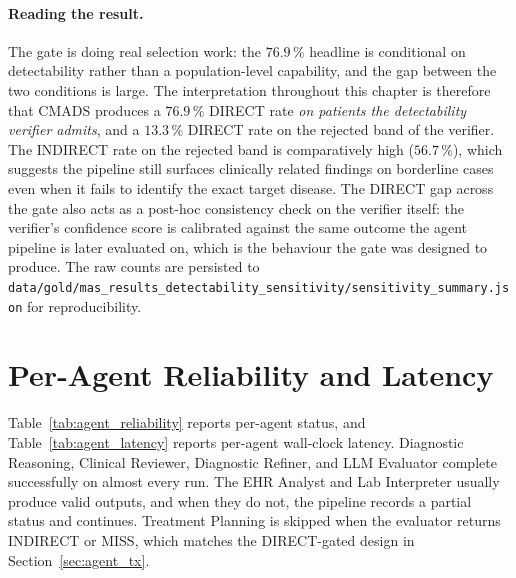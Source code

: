 \paragraph{Reading the result.}
The gate is doing real selection work: the $76.9\,\%$ headline is
conditional on detectability rather than a population-level
capability, and the gap between the two conditions is large. The
interpretation throughout this chapter is therefore that CMADS
produces a $76.9\,\%$ DIRECT rate \emph{on patients the detectability
verifier admits}, and a $13.3\,\%$ DIRECT rate on the rejected band of
the verifier. The INDIRECT rate on the rejected band is comparatively
high ($56.7\,\%$), which suggests the pipeline still surfaces
clinically related findings on borderline cases even when it fails
to identify the exact target disease. The DIRECT gap across the gate
also acts as a post-hoc consistency check on the verifier itself:
the verifier's confidence score is calibrated against the same
outcome the agent pipeline is later evaluated on, which is the
behaviour the gate was designed to produce. The raw counts are
persisted to
\texttt{data/\allowbreak gold/\allowbreak mas\_\allowbreak results\_\allowbreak detectability\_\allowbreak sensitivity/\allowbreak sensitivity\_\allowbreak summary.json}
for reproducibility.

\section{Per-Agent Reliability and Latency}
\label{sec:results_agents}

Table~\ref{tab:agent_reliability} reports per-agent status, and
Table~\ref{tab:agent_latency} reports per-agent wall-clock latency.
Diagnostic Reasoning, Clinical Reviewer, Diagnostic Refiner, and LLM
Evaluator complete successfully on almost every run. The EHR Analyst
and Lab Interpreter usually produce valid outputs, and when they do
not, the pipeline records a partial status and continues. Treatment
Planning is skipped when the evaluator returns INDIRECT or MISS,
which matches the DIRECT-gated design in Section~\ref{sec:agent_tx}.

